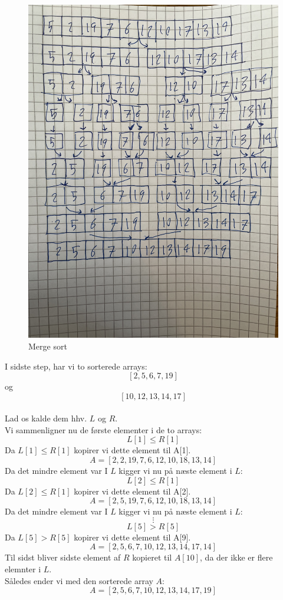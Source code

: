 \documentclass[a4paper,12pt]{article}
\begin{document}
\begin{figure}[H]
    \centering  
    \includegraphics[scale=0.13, angle=-90]{IMG_2075.jpg}
    \caption{Merge sort}
\end{figure}
\par
I sidste step, har vi to sorterede arrays:\\
\[[2, 5, 6, 7, 19]\] og \[[10, 12, 13, 14, 17]\] \\
Lad os kalde dem hhv. $L$ og $R$.\\
Vi sammenligner nu de første elementer i de to arrays:\\
\[L[1] \leq R[1]\]
Da $L[1] \leq R[1]$ kopirer vi dette element til A[1].\\
\[A = [2, 2, 19, 7, 6, 12, 10, 18, 13, 14]\]
Da det mindre element var I $L$ kigger vi nu på næste element i $L$:
\[L[2] \leq R[1]\]
Da $L[2] \leq R[1]$ kopirer vi dette element til A[2].\\
\[A = [2, 5, 19, 7, 6, 12, 10, 18, 13, 14]\]
Da det mindre element var I $L$ kigger vi nu på næste element i $L$:
\[\vdots\]
\[L[5] > R[5]\]
Da $L[5] > R[5]$ kopirer vi dette element til A[9].\\
\[A = [2, 5, 6, 7, 10, 12, 13, 14, 17, 14]\]
Til sidst bliver sidste element af $R$ kopieret til $A[10]$, da der ikke er flere elemnter i $L$.\\
Således ender vi med den sorterede array $A$:\\
\[A = [2, 5, 6, 7, 10, 12, 13, 14, 17, 19]\]
\end{document}
